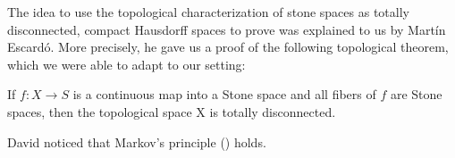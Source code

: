 The idea to use the topological characterization of stone spaces as totally disconnected, compact Hausdorff spaces to prove  was explained to us by Martín Escardó. More precisely, he gave us a proof of the following topological theorem, which we were able to adapt to our setting:

\begin{theorem*}
  If $f : X \to S$ is a continuous map into a Stone space and all fibers of $f$ are Stone spaces, then the topological space X is totally disconnected.
\end{theorem*}
David noticed that Markov's principle () holds. 
